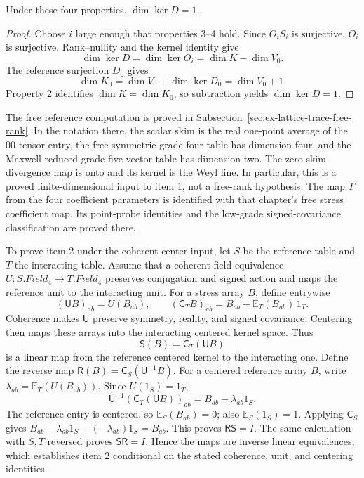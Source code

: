 \begin{lemma}
\label{lem:ex-lattice-trace-rank-one}
Under these four properties, $\dim\ker D=1$.
\end{lemma}
\begin{proof}
Choose $i$ large enough that properties 3--4 hold. Since $O_iS_i$ is
surjective, $O_i$ is surjective. Rank--nullity and the kernel identity give
\[
 \dim\ker D=\dim\ker O_i=\dim K-\dim V_0.
\]
The reference surjection $D_0$ gives
\[
 \dim K_0=\dim V_0+\dim\ker D_0=\dim V_0+1.
\]
Property 2 identifies $\dim K=\dim K_0$, so subtraction yields
$\dim\ker D=1$.
\end{proof}

The free reference computation is proved in
Subsection~\ref{sec:ex-lattice-trace-free-rank}. In the notation there, the
scalar skim is the real one-point average of the $00$ tensor entry, the
free symmetric grade-four table has dimension four, and the Maxwell-reduced
grade-five vector table has dimension two. The zero-skim divergence map is
onto and its kernel is the Weyl line. In particular, this is a proved
finite-dimensional input to item 1, not a free-rank hypothesis. The
map $T$ from the four coefficient parameters is identified with that
chapter's free stress coefficient map. Its point-probe identities and the
low-grade signed-covariance classification are proved there.


To prove item 2 under the coherent-center input, let $S$ be the reference
table and $T$ the interacting table. Assume that a coherent field equivalence $U:S.Field_4\to T.Field_4$ preserves
conjugation and signed action and maps the reference unit to the interacting
unit. For a stress array $B$, define entrywise
\[
 (\mathsf U B)_{ab}=U(B_{ab}),\qquad
 (\mathsf C_T B)_{ab}=B_{ab}-\mathbb E_T(B_{ab})\,1_T.
\]
Coherence makes $\mathsf U$ preserve symmetry, reality, and signed
covariance. Centering then maps these arrays into the interacting
centered kernel space. Thus
\[
 \mathsf S(B)=\mathsf C_T(\mathsf U B)
\]
is a linear map from the reference centered kernel to the interacting one.
Define the reverse map $\mathsf R(B)=\mathsf C_S(\mathsf U^{-1}B)$.
For a centered reference array $B$, write $\lambda_{ab}=\mathbb E_T(U(B_{ab}))$.
Since $U(1_S)=1_T$,
\[
 \mathsf U^{-1}(\mathsf C_T(\mathsf U B))_{ab}
   = B_{ab}-\lambda_{ab}1_S.
\]
The reference entry is centered, so $\mathbb E_S(B_{ab})=0$; also
$\mathbb E_S(1_S)=1$. Applying $\mathsf C_S$ gives
$B_{ab}-\lambda_{ab}1_S-(-\lambda_{ab})1_S=B_{ab}$. This proves
$\mathsf R\mathsf S=I$. The same calculation with $S,T$ reversed proves
$\mathsf S\mathsf R=I$. Hence the maps are inverse linear equivalences,
which establishes item 2 conditional on the stated coherence, unit, and
centering identities.

